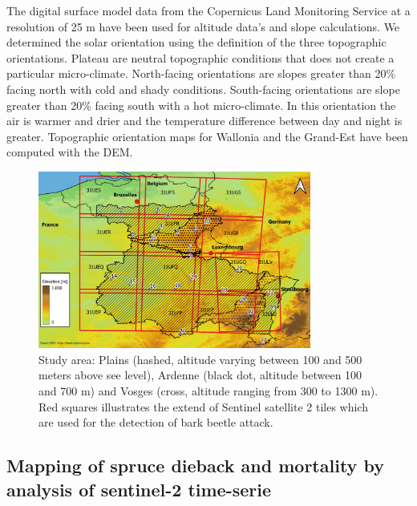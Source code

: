 \documentclass[3p,procedia]{elsarticle}
\begin{document}
The digital surface model data from the Copernicus Land Monitoring Service \citep{DEM_copernicus} at a resolution of 25 m have been used for altitude data's and slope calculations.
We determined the solar orientation using the \cite{Delvaux_galoux} definition of the three topographic orientations.
Plateau are neutral topographic conditions that does not create a particular micro-climate. 
North-facing orientations are slopes greater than  20\% facing north with cold and shady conditions.
South-facing orientations are slope greater than  20\% facing south with a hot micro-climate.
In this orientation the air is warmer and drier and the temperature difference between day and night is greater.
Topographic orientation maps for Wallonia and the Grand-Est have been computed with the DEM. 


\begin{figure} [htbp] 
	\centering
	\includegraphics[width=0.8\textwidth]{gde.jpeg}
	\caption{Study area: Plains (hashed, altitude varying between 100 and 500 meters above see level), Ardenne (black dot, altitude between 100 and 700 m) and Vosges (cross, altitude ranging from 300 to 1300 m). Red squares illustrates the extend of Sentinel satellite 2 tiles which are used for the detection of bark beetle attack.}
	\label{fig:situ}
\end{figure}

\subsection{Mapping of spruce dieback and mortality by analysis of sentinel-2 time-serie}
\end{document}
